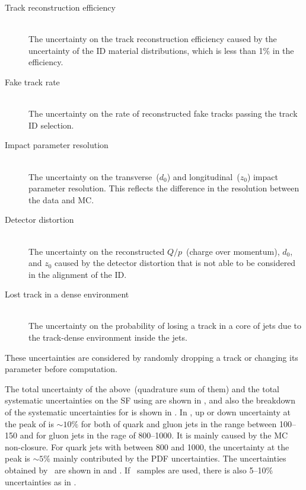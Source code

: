 \begin{description}
  \item[Track reconstruction efficiency]  \mbox{} \\
    The uncertainty on the track reconstruction efficiency caused by the uncertainty of the ID material distributions, which is less than 1\% in the efficiency.
  \item[Fake track rate]  \mbox{} \\
    The uncertainty on the rate of reconstructed fake tracks passing the track ID selection. %
  \item[Impact parameter resolution] \mbox{} \\
    The uncertainty on the transverse~($d_0$) and longitudinal~($z_0$) impact parameter resolution. This reflects the difference in the resolution between the data and MC. %
  \item[Detector distortion] \mbox{} \\
    The uncertainty on the reconstructed $Q/p$~(charge over momentum), $d_0$, and $z_0$ caused by the detector distortion that is not able to be considered in the alignment of the ID. %
  \item[Lost track in a dense environment] \mbox{} \\
    The uncertainty on the probability of losing a track in a core of jets %
    due to the track-dense environment inside the jets. 
\end{description}
These uncertainties are considered by randomly dropping a track or changing its parameter before \wtrk computation. %

The total uncertainty of the above~(quadrature sum of them) and the total systematic uncertainties on the SF using  %
are shown in , %
and also the breakdown of the systematic uncertainties for  is shown in . %
In , up or down uncertainty at the peak of \wtrk is $\sim 10\%$ for both of quark and gluon jets in the \pt range between 100--150\GeV %
and for gluon jets in the \pt rage of 800--1000\GeV. It is mainly caused by the MC non-closure. %
For quark jets with \pt between 800 and 1000\GeV, the uncertainty at the peak is $\sim 5\%$ mainly contributed by the PDF uncertainties.
The uncertainties obtained by \sherpa~are shown in  and . %
If \sherpa~samples are used, there is also 5--10\% uncertainties as in . %



